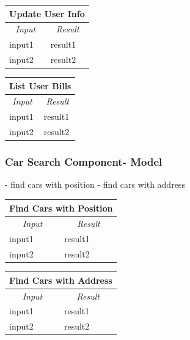 \documentclass[english]{article}
\begin{document}
\begin{center}
	\begin{tabular}{ | m{6cm} | m{6cm} | }
		\hline 
		\multicolumn{2}{|c|}{\textbf{Update User Info}} \\
		\hline
		\multicolumn{1}{|c|}{\textit{Input}} & \multicolumn{1}{c|}{\textit{Result}} \\
		\hline
		input1 & result1 \\
		\hline
		input2 & result2 \\
		\hline
	\end{tabular}
\end{center}

\begin{center}
	\begin{tabular}{ | m{6cm} | m{6cm} | }
		\hline 
		\multicolumn{2}{|c|}{\textbf{List User Bills}} \\
		\hline
		\multicolumn{1}{|c|}{\textit{Input}} & \multicolumn{1}{c|}{\textit{Result}} \\
		\hline
		input1 & result1 \\
		\hline
		input2 & result2 \\
		\hline
	\end{tabular}
\end{center}

\subsubsection{Car Search Component- Model}
- find cars with position
- find cars with address

\begin{center}
	\begin{tabular}{ | m{6cm} | m{6cm} | }
		\hline 
		\multicolumn{2}{|c|}{\textbf{Find Cars with Position}} \\
		\hline
		\multicolumn{1}{|c|}{\textit{Input}} & \multicolumn{1}{c|}{\textit{Result}} \\
		\hline
		input1 & result1 \\
		\hline
		input2 & result2 \\
		\hline
	\end{tabular}
\end{center}

\begin{center}
	\begin{tabular}{ | m{6cm} | m{6cm} | }
		\hline 
		\multicolumn{2}{|c|}{\textbf{Find Cars with Address}} \\
		\hline
		\multicolumn{1}{|c|}{\textit{Input}} & \multicolumn{1}{c|}{\textit{Result}} \\
		\hline
		input1 & result1 \\
		\hline
		input2 & result2 \\
		\hline
	\end{tabular}
\end{center}
\end{document}
